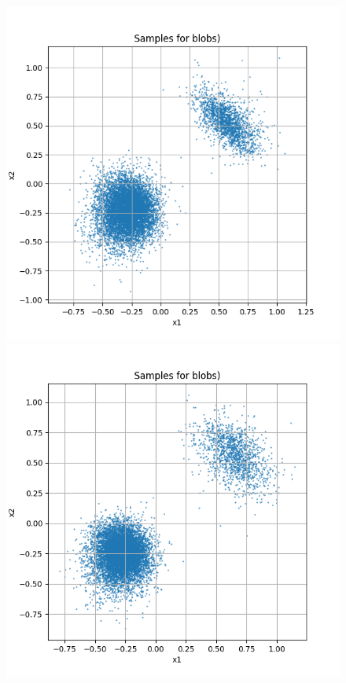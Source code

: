 \documentclass[a4paper,12pt]{article}
\begin{document}
\begin{figure}[h]
  \begin{minipage}{0.3\textwidth}
      \centering
      \includegraphics[width=\linewidth]{"images/Samples for ddpm_2_100_0.0001_0.02_blobs.png"}
  \end{minipage}
  \begin{minipage}{0.3\textwidth}
      \centering
      \includegraphics[width=\linewidth]{"images/Samples for ddpm_2_150_0.0001_0.02_blobs.png"}

\end{minipage}
\end{figure}
\end{document}
